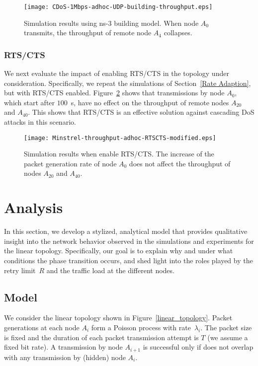 \documentclass{IEEEtran}
\begin{document}
\begin{figure}[!t]
\centering
\texttt{[image: CDoS-1Mbps-adhoc-UDP-building-throughput.eps]}
\caption{Simulation results using ns-3 building model. When node $A_0$ transmits, the throughput of remote node $A_4$ collapses.}
\label{CDoS-1Mbps-adhoc-UDP-building-utilization}
\end{figure}



\subsubsection{RTS/CTS}
We next evaluate the impact of enabling RTS/CTS in the topology under consideration. Specifically, we repeat the simulations of Section~\ref{Rate Adaption}, but with RTS/CTS enabled. Figure~\ref{Simulation Result with RTSCTS} shows  that transmissions by node $A_0$, which start after $100$~s, have no effect on the throughput of remote nodes $A_{20}$ and $A_{40}$. This shows that RTS/CTS is an effective solution against cascading DoS attacks in this scenario.

\begin{figure}[!t]
\centering
\texttt{[image: Minstrel-throughput-adhoc-RTSCTS-modified.eps]}
\caption{Simulation results when enable RTS/CTS. The increase of the packet generation rate of node $A_0$ does not affect the throughput of nodes
$A_{20}$ and $A_{40}$.}
\label{Simulation Result with RTSCTS}
\end{figure}



\section{Analysis}
\label{Analysis}
In this section, we develop a stylized, analytical model that provides qualitative insight into the network behavior observed in the simulations and experiments for the
linear topology. Specifically, our goal is to explain why  and under what conditions the phase transition occurs, and shed light into the roles
played by the retry limit~$R$ and the traffic load at the different nodes.

\subsection{Model}
\label{queueing_model}

We consider the linear topology shown in Figure~\ref{linear_topology}. Packet generations at each node $A_i$ form a
Poisson process with rate~$\lambda_i$. The packet size is fixed and the duration of each packet transmission attempt is $T$ (we assume a fixed bit
rate). A transmission by node $A_{i+1}$ is successful only if does not overlap with any transmission by (hidden) node $A_i$.
\end{document}
